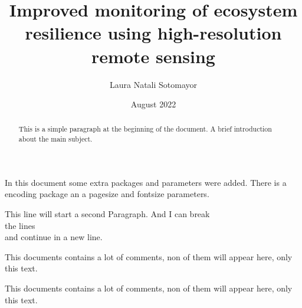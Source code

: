 \documentclass[12pt, letterpaper, twoside]{article}
\title{Improved monitoring of ecosystem resilience using high-resolution remote sensing }
\author{Laura Natali Sotomayor}\\
\date{August 2022}
\begin{document}
\begin{titlepage}
\maketitle
\end{titlepage}

\begin{abstract}
This is a simple paragraph at the beginning of the 
document. A brief introduction about the main subject.
\end{abstract}

In this document some extra packages and parameters
were added. There is a encoding package
an a pagesize and fontsize parameters.

This line will start a second Paragraph. And I can break\\ the lines \\
and continue in a new line.

This documents contains a lot of comments, non of them
will appear here, only this text.

This documents contains a lot of comments, non of them
will appear here, only this text.

\begin{comment}
This text won't show up in the compiled pdf
this is just a multi-line comment. Useful
to, for instance, comment out slow-rendering
while working on the draft.
\end{comment}
\end{document}
